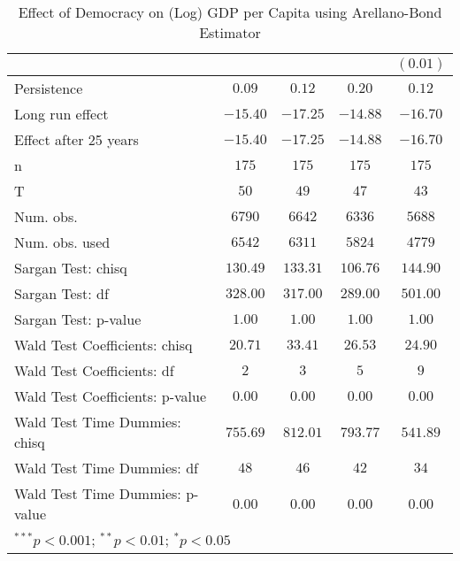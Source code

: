 \begin{table}
\begin{center}
\begin{tabular}{l c c c c}
                                &               &               &              & $(0.01)$      \\
\hline
Persistence                     & $0.09$        & $0.12$        & $0.20$       & $0.12$        \\
Long run effect                 & $-15.40$      & $-17.25$      & $-14.88$     & $-16.70$      \\
Effect after 25 years           & $-15.40$      & $-17.25$      & $-14.88$     & $-16.70$      \\
n                               & $175$         & $175$         & $175$        & $175$         \\
T                               & $50$          & $49$          & $47$         & $43$          \\
Num. obs.                       & $6790$        & $6642$        & $6336$       & $5688$        \\
Num. obs. used                  & $6542$        & $6311$        & $5824$       & $4779$        \\
Sargan Test: chisq              & $130.49$      & $133.31$      & $106.76$     & $144.90$      \\
Sargan Test: df                 & $328.00$      & $317.00$      & $289.00$     & $501.00$      \\
Sargan Test: p-value            & $1.00$        & $1.00$        & $1.00$       & $1.00$        \\
Wald Test Coefficients: chisq   & $20.71$       & $33.41$       & $26.53$      & $24.90$       \\
Wald Test Coefficients: df      & $2$           & $3$           & $5$          & $9$           \\
Wald Test Coefficients: p-value & $0.00$        & $0.00$        & $0.00$       & $0.00$        \\
Wald Test Time Dummies: chisq   & $755.69$      & $812.01$      & $793.77$     & $541.89$      \\
Wald Test Time Dummies: df      & $48$          & $46$          & $42$         & $34$          \\
Wald Test Time Dummies: p-value & $0.00$        & $0.00$        & $0.00$       & $0.00$        \\
\hline
\multicolumn{5}{l}{\scriptsize{$^{***}p<0.001$; $^{**}p<0.01$; $^{*}p<0.05$}}
\end{tabular}
\caption{Effect of Democracy on (Log) GDP per Capita using Arellano-Bond Estimator}
\label{table:coefficients}
\end{center}
\end{table}
